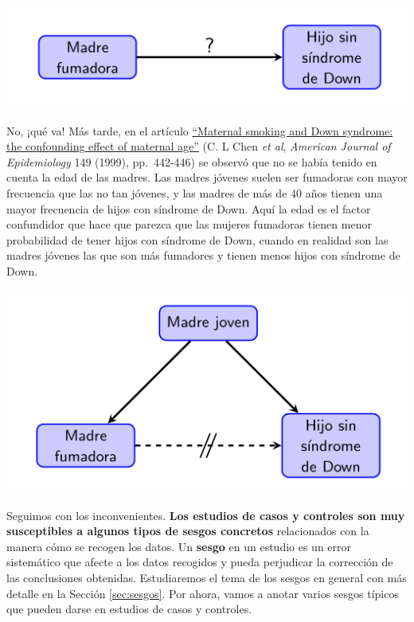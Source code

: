 \documentclass[
]{book}
\theoremstyle{definition}
\theoremstyle{definition}
\theoremstyle{definition}
\theoremstyle{definition}
\theoremstyle{remark}
\begin{document}
\begin{center}\includegraphics[width=0.8\linewidth]{INREMDN_files/figure-html/Down1} \end{center}

No, ¡qué va! Más tarde, en el artículo \href{https://academic.oup.com/aje/article/149/5/442/135974}{``Maternal smoking and Down syndrome: the confounding effect of maternal age''} (C. L Chen \emph{et al}, \emph{American Journal of Epidemiology} 149 (1999), pp.~442-446) se observó que no se había tenido en cuenta la edad de las madres. Las madres jóvenes suelen ser fumadoras con mayor frecuencia que las no tan jóvenes, y las madres de más de 40 años tienen una mayor frecuencia de hijos con síndrome de Down. Aquí la edad es el factor confundidor que hace que parezca que las mujeres fumadoras tienen menor probabilidad de tener hijos con síndrome de Down, cuando en realidad son las madres jóvenes las que son más fumadores y tienen menos hijos con síndrome de Down.

\begin{center}\includegraphics[width=0.8\linewidth]{INREMDN_files/figure-html/Down2} \end{center}

Seguimos con los inconvenientes. \textbf{Los estudios de casos y controles son muy susceptibles a algunos tipos de sesgos concretos} relacionados con la manera cómo se recogen los datos. Un \textbf{sesgo} en un estudio es un error sistemático que afecte a los datos recogidos y pueda perjudicar la corrección de las conclusiones obtenidas. Estudiaremos el tema de los sesgos en general con más detalle en la Sección \ref{sec:sesgos}. Por ahora, vamos a anotar varios sesgos típicos que pueden darse en estudios de casos y controles.
\end{document}
